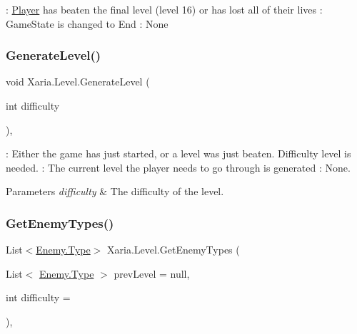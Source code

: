 \+: \hyperlink{classXaria_1_1Player}{Player} has beaten the final level (level 16) or has lost all of their lives \+: Game\+State is changed to End \+: None 

\mbox{\label{classXaria_1_1Level_a22bccc0212af3ebce89ad36a735cf2f1}} 
\subsubsection{\texorpdfstring{Generate\+Level()}{GenerateLevel()}}
{\footnotesize\ttfamily void Xaria.\+Level.\+Generate\+Level (\begin{DoxyParamCaption}\item[{int}]{difficulty }\end{DoxyParamCaption})\hspace{0.3cm}{\ttfamily [inline]}, {\ttfamily [private]}}



\+: Either the game has just started, or a level was just beaten. Difficulty level is needed. \+: The current level the player needs to go through is generated \+: None. 


\begin{DoxyParams}{Parameters}
{\em difficulty} & The difficulty of the level.\\
\hline
\end{DoxyParams}
\mbox{\label{classXaria_1_1Level_ae564a661679ef491ffc9ec1406a34d51}} 
\subsubsection{\texorpdfstring{Get\+Enemy\+Types()}{GetEnemyTypes()}}
{\footnotesize\ttfamily List$<$\hyperlink{classXaria_1_1Enemy_af736652ccf0a3aabacb41bd1afd41234}{Enemy.\+Type}$>$ Xaria.\+Level.\+Get\+Enemy\+Types (\begin{DoxyParamCaption}\item[{List$<$ \hyperlink{classXaria_1_1Enemy_af736652ccf0a3aabacb41bd1afd41234}{Enemy.\+Type} $>$}]{prev\+Level = {\ttfamily null},  }\item[{int}]{difficulty = {} }\end{DoxyParamCaption})\hspace{0.3cm}{\ttfamily [inline]}, {\ttfamily [private]}}



